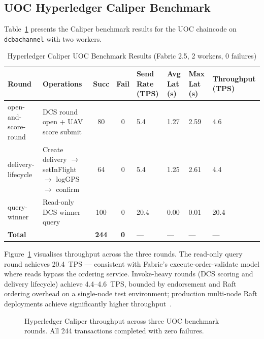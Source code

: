 \documentclass[sigplan,screen,review=false]{acmart}
\begin{document}
\subsection{UOC Hyperledger Caliper Benchmark}

Table~\ref{tab:caliper} presents the Caliper benchmark results for the
UOC chaincode on \texttt{dcbachannel} with two workers.

\begin{table}[ht]
\centering
\caption{Hyperledger Caliper UOC Benchmark Results (Fabric 2.5, 2 workers, 0 failures)}
\label{tab:caliper}
\begin{tabular}{@{}p{3.5cm}p{3cm}ccp{1.5cm}p{1.5cm}p{1.5cm}p{1.8cm}@{}}
\toprule
\textbf{Round} & \textbf{Operations} & \textbf{Succ} & \textbf{Fail}
  & \textbf{Send Rate (TPS)} & \textbf{Avg Lat (s)} & \textbf{Max Lat (s)} & \textbf{Throughput (TPS)} \\
\midrule
open-and-score-round & DCS round open + UAV score submit
  & 80 & 0 & 5.4 & 1.27 & 2.59 & 4.6 \\
delivery-lifecycle & Create delivery $\to$ setInFlight $\to$ logGPS $\to$ confirm
  & 64 & 0 & 5.4 & 1.25 & 2.61 & 4.4 \\
query-winner & Read-only DCS winner query
  & 100 & 0 & 20.4 & 0.00 & 0.01 & 20.4 \\
\midrule
\textbf{Total} & & \textbf{244} & \textbf{0} & --- & --- & --- & --- \\
\bottomrule
\end{tabular}
\end{table}

Figure~\ref{fig:caliper} visualises throughput across the three rounds.
The read-only query round achieves 20.4~TPS --- consistent with
Fabric's execute-order-validate model where reads bypass the ordering
service. Invoke-heavy rounds (DCS scoring and delivery lifecycle)
achieve 4.4--4.6~TPS, bounded by endorsement and Raft ordering
overhead on a single-node test environment; production multi-node Raft
deployments achieve significantly higher throughput~\cite{androulaki2018hyperledger}.

\begin{figure}[h]
  \centering
  \caption{Hyperledger Caliper throughput across three UOC benchmark
    rounds. All 244 transactions completed with zero failures.}
  \label{fig:caliper}
\end{figure}
\end{document}

